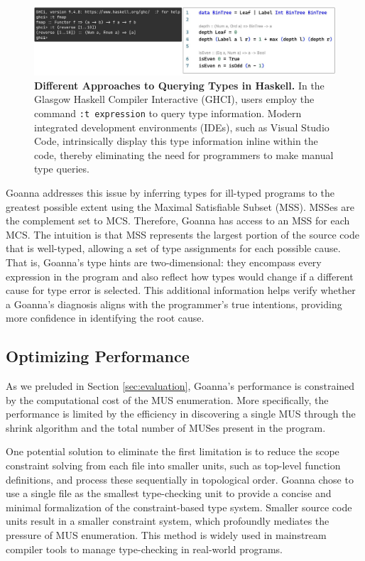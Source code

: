 \documentclass[pdflatex,lineno,sn-nature,Numbered]{sn-jnl}%
\begin{document}
\begin{figure}[hbt]
  \centering
  \includegraphics[width=0.9\linewidth]{images/TypeHints.pdf}
  \caption{\textbf{Different Approaches to Querying Types in Haskell.} In the Glasgow Haskell Compiler Interactive (GHCI), users employ the command \texttt{:t expression} to query type information. Modern integrated development environments (IDEs), such as Visual Studio Code, intrinsically display this type information inline within the code, thereby eliminating the need for programmers to make manual type queries.}
  \label{fig:typehints}
\end{figure}

Goanna addresses this issue by inferring types for ill-typed programs to the greatest possible extent using the Maximal Satisfiable Subset (MSS). MSSes are the complement set to MCS. Therefore, Goanna has access to an MSS for each MCS. The intuition is that MSS represents the largest portion of the source code that is well-typed, allowing a set of type assignments for each possible cause. That is, Goanna's type hints are two-dimensional: they encompass every expression in the program and also reflect how types would change if a different cause for type error is selected. This additional information helps verify whether a Goanna's diagnosis aligns with the programmer's true intentions, providing more confidence in identifying the root cause.

\subsection{Optimizing Performance}

As we preluded in Section \ref{sec:evaluation}, Goanna's performance is constrained by the computational cost of the MUS enumeration. More specifically, the performance is limited by the efficiency in discovering a single MUS through the shrink algorithm and the total number of MUSes present in the program. 

One potential solution to eliminate the first limitation is to reduce the scope constraint solving from each file into smaller units, such as top-level function definitions, and process these sequentially in topological order. Goanna chose to use a single file as the smallest type-checking unit to provide a concise and minimal formalization of the constraint-based type system.  Smaller source code units result in a smaller constraint system, which profoundly mediates the pressure of MUS enumeration. This method is widely used in mainstream compiler tools to manage type-checking in real-world programs. 
\end{document}
